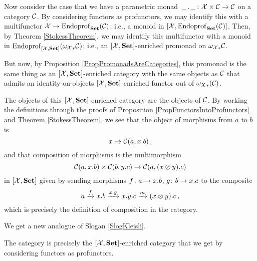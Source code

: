 \documentclass{article}
\begin{document}
Now consider the case that we have a parametric monad $\,\underline{\hspace{1.5ex}}\,.\,\underline{\hspace{1.5ex}}\,\colon\mathcal X \times {\mathcal{C}} \to {\mathcal{C}}$ on a category ${\mathcal{C}}$.  
By considering functors as profunctors, we may identify this with a multifunctor $\mathcal X \to \operatorname{Endoprof}_{\normalfont\textbf{Set}}({\mathcal{C}})$; i.e., a monoid in $[\mathcal X,\operatorname{Endoprof}_{\normalfont\textbf{Set}}({\mathcal{C}})]$.
Then, by Theorem \ref{StokessTheorem}, we may identify this multifunctor with a monoid in $\operatorname{Endoprof}_{[\mathcal X,{\normalfont\textbf{Set}}]}({\omega_\mathcal X}_*{\mathcal{C}})$; i.e., an $[\mathcal X,{\normalfont\textbf{Set}}]$-enriched promonad on ${\omega_\mathcal X}_*{\mathcal{C}}$.

But now, by Proposition \ref{PropPromonadsAreCategories}, this promonad is the same thing as an $[\mathcal X,{\normalfont\textbf{Set}}]$-enriched category with the same objects as ${\mathcal{C}}$ that admits an identity-on-objects $[\mathcal X,{\normalfont\textbf{Set}}]$-enriched functor out of ${\omega_X}_*({\mathcal{C}})$.  

The objects of this $[\mathcal X,{\normalfont\textbf{Set}}]$-enriched category are the objects of ${\mathcal{C}}$.
By working the definitions through the proofs of Proposition \ref{PropFunctorsIntoProfunctors} and Theorem \ref{StokessTheorem}, we see that the object of morphisms from $a$ to $b$ is
\[
  x \mapsto {\mathcal{C}}(a,x.b)\,,
  \]
and that composition of morphisms is the multimorphism
\[
  {\mathcal{C}}(a,x.b) \times {\mathcal{C}}(b,y.c) \to {\mathcal{C}}(a,(x\otimes y).c)
  \]
in $[\mathcal X,{\normalfont\textbf{Set}}]$ given by sending morphisms $f\colon a \to x.b$, $g\colon b \to x.c$ to the composite
\[
  a
  \xrightarrow{f}
  x.b
  \xrightarrow{x.g}
  x.y.c \xrightarrow{m}
  (x\otimes y).c\,,
  \]
which is precisely the definition of composition in the \Mellies category.

We get a new analogue of Slogan \ref{SlogKleisli}.

\begin{slogan}
  The \Mellies category is precisely the $[\mathcal X,{\normalfont\textbf{Set}}]$-enriched category that we get by considering functors as profunctors.
\end{slogan}



\end{document}
